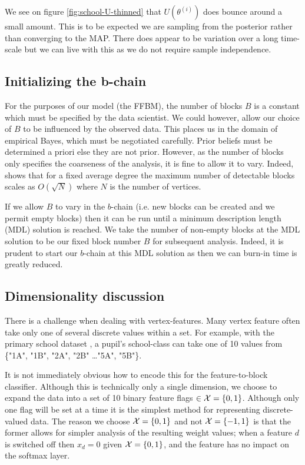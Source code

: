 We see on figure \ref{fig:school-U-thinned} that $U(\theta^{(i)})$ does bounce around a small amount. This is to be expected we are sampling from the posterior rather than converging to the MAP. There does appear to be variation over a long time-scale but we can live with this as we do not require sample independence.
\FloatBarrier
\subsection{Initializing the b-chain}

For the purposes of our model (the FFBM), the number of blocks $B$ is a constant which must be specified by the data scientist. We could however, allow our choice of $B$ to be influenced by the observed data. This places us in the domain of empirical Bayes, which must be negotiated carefully. Prior beliefs must be determined a priori else they are not prior. However, as the number of blocks only specifies the coarseness of the analysis, it is fine to allow it to vary. Indeed, \citet{peixoto-determine-B} shows that for a fixed average degree the maximum number of detectable blocks scales as $O(\sqrt{N})$ where $N$ is the number of vertices.

If we allow $B$ to vary in the $b$-chain (i.e. new blocks can be created and we permit empty blocks) then it can be run  until a minimum description length (MDL) solution is reached. We take the number of non-empty blocks at the MDL solution to be our fixed block number $B$ for subsequent analysis. Indeed, it is prudent to start our $b$-chain at this MDL solution as then we can burn-in time is greatly reduced.

\subsection{Dimensionality discussion}
\label{appdx:dimension}

There is a challenge when dealing with vertex-features. Many vertex feature often take only one of several discrete values within a set. For example, with the primary school dataset \cite{schools}, a pupil's school-class can take one of 10 values from \{"1A", "1B", "2A", "2B" \dots "5A", "5B"\}.

It is not immediately obvious how to encode this for the feature-to-block classifier. Although this is technically only a single dimension, we choose to expand the data into a set of 10 binary feature flags $\in \mathcal{X} = \{0, 1\}$. Although only one flag will be set at a time it is the simplest method for representing discrete-valued data. The reason we choose $\mathcal{X}=\{0, 1\}$ and not $\mathcal{X} = \{-1, 1\}$ is that the former allows for simpler analysis of the resulting weight values; when a feature $d$ is switched off then $x_{d}=0$ given $\mathcal{X} = \{0, 1\}$, and the feature has no impact on the softmax layer.

